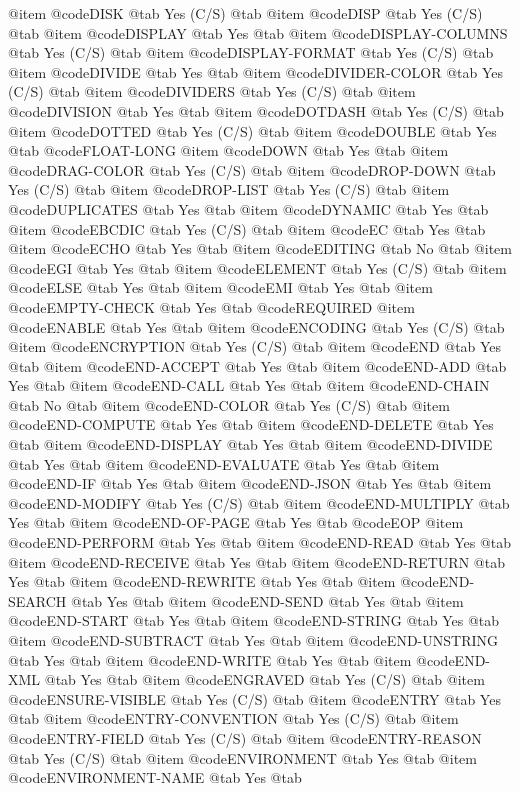 @item @code{DISK} @tab Yes	(C/S) @tab
@item @code{DISP} @tab Yes (C/S) @tab
@item @code{DISPLAY} @tab Yes @tab
@item @code{DISPLAY-COLUMNS} @tab Yes	(C/S) @tab
@item @code{DISPLAY-FORMAT} @tab Yes	(C/S) @tab
@item @code{DIVIDE} @tab Yes @tab
@item @code{DIVIDER-COLOR} @tab Yes	(C/S) @tab
@item @code{DIVIDERS} @tab Yes	(C/S) @tab
@item @code{DIVISION} @tab Yes @tab
@item @code{DOTDASH} @tab Yes	(C/S) @tab
@item @code{DOTTED} @tab Yes	(C/S) @tab
@item @code{DOUBLE} @tab Yes @tab @code{FLOAT-LONG}
@item @code{DOWN} @tab Yes @tab
@item @code{DRAG-COLOR} @tab Yes	(C/S) @tab
@item @code{DROP-DOWN} @tab Yes	(C/S) @tab
@item @code{DROP-LIST} @tab Yes	(C/S) @tab
@item @code{DUPLICATES} @tab Yes @tab
@item @code{DYNAMIC} @tab Yes @tab
@item @code{EBCDIC} @tab Yes	(C/S) @tab
@item @code{EC} @tab Yes @tab
@item @code{ECHO} @tab Yes @tab
@item @code{EDITING} @tab No @tab
@item @code{EGI} @tab Yes @tab
@item @code{ELEMENT} @tab Yes	(C/S) @tab
@item @code{ELSE} @tab Yes @tab
@item @code{EMI} @tab Yes @tab
@item @code{EMPTY-CHECK} @tab Yes @tab @code{REQUIRED}
@item @code{ENABLE} @tab Yes @tab
@item @code{ENCODING} @tab Yes	(C/S) @tab
@item @code{ENCRYPTION} @tab Yes	(C/S) @tab
@item @code{END} @tab Yes @tab
@item @code{END-ACCEPT} @tab Yes @tab
@item @code{END-ADD} @tab Yes @tab
@item @code{END-CALL} @tab Yes @tab
@item @code{END-CHAIN} @tab No @tab
@item @code{END-COLOR} @tab Yes	(C/S) @tab
@item @code{END-COMPUTE} @tab Yes @tab
@item @code{END-DELETE} @tab Yes @tab
@item @code{END-DISPLAY} @tab Yes @tab
@item @code{END-DIVIDE} @tab Yes @tab
@item @code{END-EVALUATE} @tab Yes @tab
@item @code{END-IF} @tab Yes @tab
@item @code{END-JSON} @tab Yes @tab
@item @code{END-MODIFY} @tab Yes	(C/S) @tab
@item @code{END-MULTIPLY} @tab Yes @tab
@item @code{END-OF-PAGE} @tab Yes @tab @code{EOP}
@item @code{END-PERFORM} @tab Yes @tab
@item @code{END-READ} @tab Yes @tab
@item @code{END-RECEIVE} @tab Yes @tab
@item @code{END-RETURN} @tab Yes @tab
@item @code{END-REWRITE} @tab Yes @tab
@item @code{END-SEARCH} @tab Yes @tab
@item @code{END-SEND} @tab Yes @tab
@item @code{END-START} @tab Yes @tab
@item @code{END-STRING} @tab Yes @tab
@item @code{END-SUBTRACT} @tab Yes @tab
@item @code{END-UNSTRING} @tab Yes @tab
@item @code{END-WRITE} @tab Yes @tab
@item @code{END-XML} @tab Yes @tab
@item @code{ENGRAVED} @tab Yes	(C/S) @tab
@item @code{ENSURE-VISIBLE} @tab Yes	(C/S) @tab
@item @code{ENTRY} @tab Yes @tab
@item @code{ENTRY-CONVENTION} @tab Yes	(C/S) @tab
@item @code{ENTRY-FIELD} @tab Yes	(C/S) @tab
@item @code{ENTRY-REASON} @tab Yes	(C/S) @tab
@item @code{ENVIRONMENT} @tab Yes @tab
@item @code{ENVIRONMENT-NAME} @tab Yes @tab
